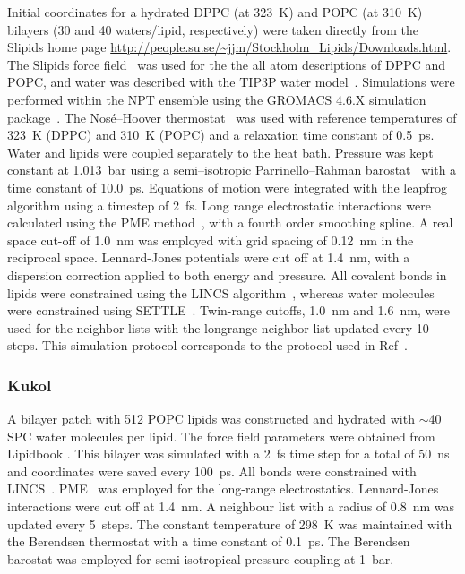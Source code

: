 \documentclass[pre,aps,floatfix,authordate1-4,twocolumn]{revtex4-1}
\begin{document}
Initial coordinates for a hydrated DPPC (at 323~K) and POPC (at 310~K) bilayers (30 and 40 waters/lipid, respectively) were taken directly from the 
Slipids home page \url{http://people.su.se/\~jjm/Stockholm\_Lipids/Downloads.html}.  The Slipids force field~\cite{jambeck12,jambeck12b} was used for the the all atom descriptions of DPPC and POPC, and
water was described with the TIP3P water model~\cite{jorgensen83}. Simulations were performed within the NPT ensemble using the GROMACS 4.6.X simulation
package~\cite{hess08}. The Nos\'{e}--Hoover thermostat~\cite{nose84,hoover85} was used with reference temperatures of
323~K (DPPC) and 310~K (POPC) and a relaxation time constant of 0.5~ps. Water and lipids were coupled separately to
the heat bath. Pressure was kept constant at 1.013~bar using a semi--isotropic Parrinello--Rahman
barostat~\cite{parrinello81} with a time constant of 10.0~ps. Equations of motion were
integrated with the leapfrog algorithm using a timestep of 2~fs. Long range
electrostatic interactions were calculated using the PME method~\cite{darden93,essman95}, with a fourth order
smoothing spline. A real space cut-off of 1.0~nm was employed with grid spacing of 0.12~nm in the reciprocal space.
Lennard-Jones potentials were cut off at 1.4~nm, with a dispersion correction applied to both energy and pressure. All covalent bonds in lipids were constrained using the LINCS algorithm~\cite{hess97}, 
whereas water molecules were constrained using SETTLE~\cite{miyamoto92}. Twin-range cutoffs,
1.0~nm and 1.6~nm, were used for the neighbor lists with the longrange neighbor list updated every
10 steps. This simulation protocol corresponds to the protocol used in Ref~\cite{jambeck13}. 

\subsubsection{Kukol}
A bilayer patch with 512 POPC lipids was constructed and hydrated with $\sim$40 SPC water molecules per lipid. 
The force field parameters were obtained from Lipidbook \cite{domanski10}.
This bilayer was simulated with a 2~fs time step for a total of 50~ns and coordinates were saved every 100~ps. 
All bonds were constrained with LINCS~\cite{hess97,hess07}. PME~\cite{darden93,essman95} was employed for the long-range electrostatics. Lennard-Jones interactions 
were cut off at 1.4~nm. A neighbour list with a radius of 0.8~nm was updated every 5~steps. The constant temperature of 298~K 
was maintained with the Berendsen thermostat \cite{berendsen84} with a time constant of 0.1~ps. The Berendsen barostat \cite{berendsen84} 
was employed for semi-isotropical pressure coupling at 1~bar.
\end{document}
